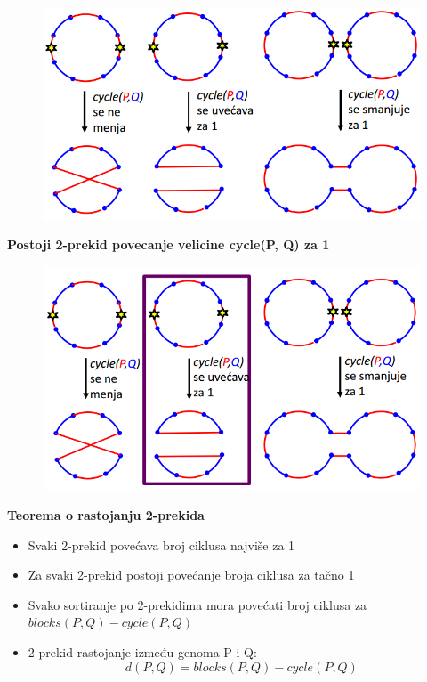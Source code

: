 \begin{figure}[h!]
\centering
\includegraphics[scale=0.5]{poglavlja/6/slike/izmena2prekidima.PNG}
\caption{}
\label{slika:X}
\end{figure}
\newpage
\noindent \textbf{Postoji 2-prekid povecanje velicine cycle(P, Q) za 1}
\begin{figure}[h]
\centering
\includegraphics[scale=0.6]{poglavlja/6/slike/izmena2prekidima2.PNG}
\caption{}
\label{slika:X}
\end{figure}

\noindent \textbf{Teorema o rastojanju 2-prekida}
\begin{itemize}
    \item Svaki 2-prekid povećava broj ciklusa najviše za 1
    \item Za svaki 2-prekid postoji povećanje broja ciklusa za tačno 1
    \item Svako sortiranje po 2-prekidima mora povećati broj ciklusa za $blocks(P,Q) - cycle(P, Q)$
    \item 2-prekid rastojanje između genoma P i Q:   $$d(P,Q) = blocks(P, Q) - cycle(P,Q)$$
\end{itemize}

